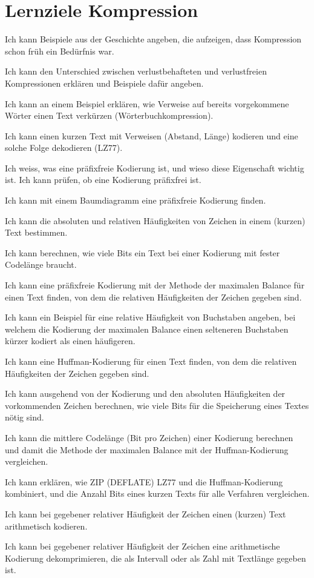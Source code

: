 \chapter{Lernziele Kompression}
\begin{todolist}
\item Ich kann Beispiele aus der Geschichte angeben, die aufzeigen, dass Kompression schon früh ein Bedürfnis war.
\item Ich kann den Unterschied zwischen verlustbehafteten und verlustfreien Kompressionen erklären und Beispiele dafür angeben.
\item Ich kann an einem Beispiel erklären, wie Verweise auf bereits vorgekommene Wörter einen Text verkürzen (Wörterbuchkompression).
\item Ich kann einen kurzen Text mit Verweisen (Abstand, Länge) kodieren und eine solche Folge dekodieren (LZ77).
\item Ich weiss, was eine präfixfreie Kodierung ist, und wieso diese Eigenschaft wichtig ist. Ich kann prüfen, ob eine Kodierung präfixfrei ist.
\item Ich kann mit einem Baumdiagramm eine präfixfreie Kodierung finden.
\item Ich kann die absoluten und relativen Häufigkeiten von Zeichen in einem (kurzen) Text bestimmen.
\item Ich kann berechnen, wie viele Bits ein Text bei einer Kodierung mit fester Codelänge braucht.
\item Ich kann eine präfixfreie Kodierung mit der Methode der maximalen Balance für einen Text finden, von dem die relativen Häufigkeiten der Zeichen gegeben sind.
\item Ich kann ein Beispiel für eine relative Häufigkeit von Buchstaben angeben, bei welchem die Kodierung der maximalen Balance einen selteneren Buchstaben kürzer kodiert als einen häufigeren.
\item Ich kann eine Huffman-Kodierung für einen Text finden, von dem die relativen Häufigkeiten der Zeichen gegeben sind.
\item Ich kann ausgehend von der Kodierung und den absoluten Häufigkeiten der vorkommenden Zeichen berechnen, wie viele Bits für die Speicherung eines Textes nötig sind.
\item Ich kann die mittlere Codelänge (Bit pro Zeichen) einer Kodierung berechnen und damit die Methode der maximalen Balance mit der Huffman-Kodierung vergleichen.
\item Ich kann erklären, wie ZIP (DEFLATE) LZ77 und die Huffman-Kodierung kombiniert, und die Anzahl Bits eines kurzen Texts für alle Verfahren vergleichen.
\item Ich kann bei gegebener relativer Häufigkeit der Zeichen einen (kurzen) Text arithmetisch kodieren.
\item Ich kann bei gegebener relativer Häufigkeit der Zeichen eine arithmetische Kodierung dekomprimieren, die als Intervall oder als Zahl mit Textlänge gegeben ist.
\end{todolist}